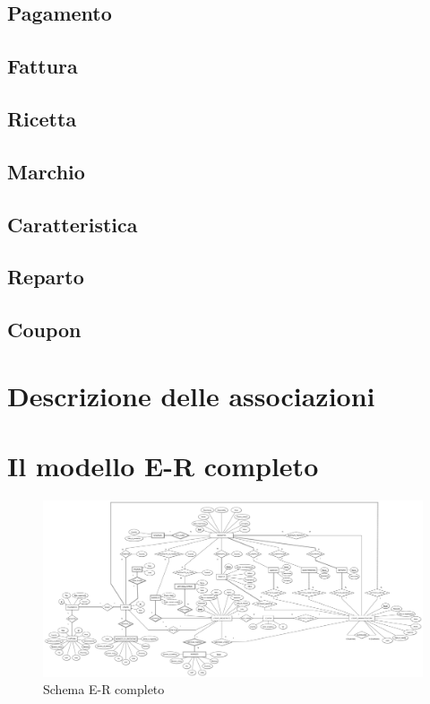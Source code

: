 	\subsection{Pagamento}
	
	\subsection{Fattura}
	
	\subsection{Ricetta}
	
	\subsection{Marchio}
	
	\subsection{Caratteristica}
	
	\subsection{Reparto}
		
	\subsection{Coupon}

\section{Descrizione delle associazioni}

\section{Il modello E-R completo}
\begin{figure}[h]
	\centering
	\includegraphics[width=1\textheight,
	angle=90]
	{immagini/schema_totale}
	
	\caption{Schema E-R completo}
\end{figure}	